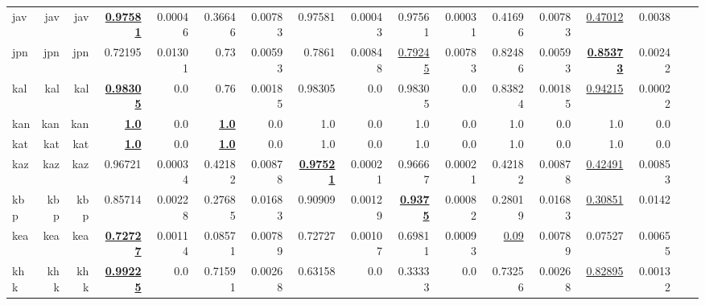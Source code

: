\documentclass[11pt]{article}
\begin{document}
\begin{table*}[h]
{\begin{tabular}{lrrrrrrrrrrrrrrrr}
jav         & jav         & jav         & \textbf{\underline{0.97581}}         & 0.00046         & 0.36646         & 0.00783         & 0.97581         & 0.00043         & 0.97561         & 0.00031         & 0.41696         & 0.00783         & \underline{0.47012}         & 0.0038         \\
jpn         & jpn         & jpn         & 0.72195         & 0.01301         & 0.73         & 0.00593         & 0.7861         & 0.00848         & \underline{0.79245}         & 0.00783         & 0.82486         & 0.00593         & \textbf{\underline{0.85373}}         & 0.00242         \\
kal         & kal         & kal         & \textbf{\underline{0.98305}}         & 0.0         & 0.76         & 0.00185         & 0.98305         & 0.0         & 0.98305         & 0.0         & 0.83824         & 0.00185         & \underline{0.94215}         & 0.00022         \\
kan         & kan         & kan         & \textbf{\underline{1.0}}         & 0.0         & \textbf{\underline{1.0}}         & 0.0         & 1.0         & 0.0         & 1.0         & 0.0         & 1.0         & 0.0         & 1.0         & 0.0         \\
kat         & kat         & kat         & \textbf{\underline{1.0}}         & 0.0         & \textbf{\underline{1.0}}         & 0.0         & 1.0         & 0.0         & 1.0         & 0.0         & 1.0         & 0.0         & 1.0         & 0.0         \\
kaz         & kaz         & kaz         & 0.96721         & 0.00034         & 0.42182         & 0.00878         & \textbf{\underline{0.97521}}         & 0.00021         & 0.96667         & 0.00021         & 0.42182         & 0.00878         & \underline{0.42491}         & 0.00853         \\
kbp         & kbp         & kbp         & 0.85714         & 0.00228         & 0.27685         & 0.01683         & 0.90909         & 0.00129         & \textbf{\underline{0.9375}}         & 0.00082         & 0.28019         & 0.01683         & \underline{0.30851}         & 0.0142         \\
kea         & kea         & kea         & \textbf{\underline{0.72727}}         & 0.00114         & 0.08571         & 0.00789         & 0.72727         & 0.00107         & 0.69811         & 0.00093         & \underline{0.09}         & 0.00789         & 0.07527         & 0.00655         \\
khk         & khk         & khk         & \textbf{\underline{0.99225}}         & 0.0         & 0.71591         & 0.00268         & 0.63158         & 0.0         & 0.33333         & 0.0         & 0.73256         & 0.00268         & \underline{0.82895}         & 0.00132         \\

\end{tabular}}
\end{table*}
\end{document}
